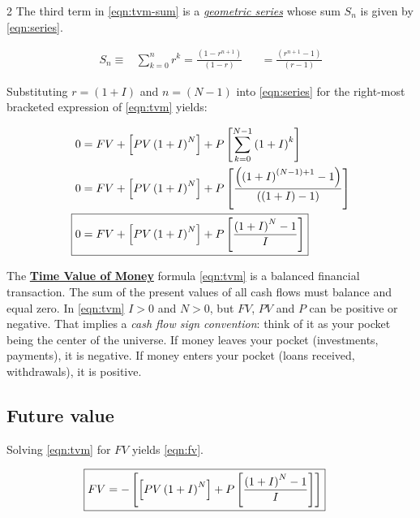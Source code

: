 \documentclass[11pt]{article}%
\begin{document}
\begin{multicols*}{2}
The third term in \eqref{eqn:tvm-sum} is a \href{https://en.wikipedia.org/wiki/Geometric_series#Convergence_of_the_series_and_its_proof}{\textit{geometric series}} whose sum $S_{n}$ is given by \eqref{eqn:series}.

\begin{align}
S_{n} \equiv& \sum_{k=0}^{n} r^{k} = \frac{\left( 1 - r^{n + 1} \right)}{\left( 1 - r \right)} &&= \frac{\left( r^{n + 1} - 1 \right)}{\left( r - 1 \right)} \label{eqn:series} %
\end{align}

Substituting $r = \left( 1 + I \right)$ and $n = \left( N - 1 \right)$ into \eqref{eqn:series} for the right-most bracketed expression of \eqref{eqn:tvm} yields:

\begin{align}
0 &= FV + \left[ PV \left( 1 + I \right)^{N} \right] + P \left[ \sum_{k=0}^{N - 1} \left( 1 + I \right)^{k} \right] \\
0 &= FV + \left[ PV \left( 1 + I \right)^{N} \right] + P \left[ \frac{\left( \left( 1 + I \right)^{\left( N - 1 \right) + 1} - 1 \right)}{\left( \left( 1 + I \right) - 1 \right)} \right] \\
\Aboxed{0 &= FV + \left[ PV \left( 1 + I \right)^{N} \right] + P \left[\frac{\left( 1 + I \right)^{N} - 1}{I} \right]} \label{eqn:tvm}
\end{align}

The \textbf{\href{https://en.wikipedia.org/wiki/Time_value_of_money}{Time Value of Money}} formula \eqref{eqn:tvm} is a balanced financial transaction. The sum of the present values of all cash flows must balance and equal zero. In \eqref{eqn:tvm} $I > 0$ and $N > 0$, but $FV$, $PV$ and $P$ can be positive or negative. That implies a \textit{cash flow sign convention}: think of it as your pocket being the center of the universe. If money leaves your pocket (investments, payments), it is negative. If money enters your pocket (loans received, withdrawals), it is positive.

\subsection{Future value}\label{sec:fv}

Solving \eqref{eqn:tvm} for $FV$ yields \eqref{eqn:fv}.

\begin{align}
\Aboxed{FV &= -\left[ \left[ PV \left( 1 + I \right)^{N} \right] + P \left[\frac{\left( 1 + I \right)^{N} - 1}{I} \right] \right]} \label{eqn:fv}
\end{align}


\end{multicols*}
\end{document}
